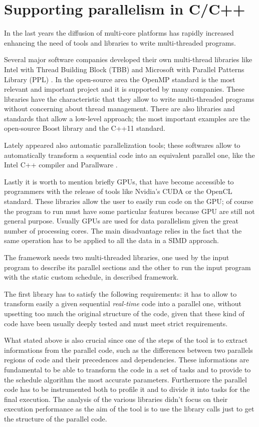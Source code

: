 \documentclass[a4paper,12pt,oneside]{book}
\begin{document}
\section{Supporting parallelism in C/C++}

In the last years the diffusion of multi-core platforms has rapidly increased enhancing the need of tools and libraries to write multi-threaded programs. 

Several major software companies developed their own multi-thread libraries like Intel with Thread Building Block (TBB) \cite{tbb} and Microsoft with Parallel Patterns Library (PPL) \cite{ppl}. In the open-source area the OpenMP standard \cite{openmp} is the  most relevant and important project and it is supported by many companies. These libraries have the characteristic that they allow to write multi-threaded programs without concerning about thread management. There are also libraries and standards that allow a low-level approach; the most important examples are the open-source Boost library \cite{boost} and the C++11 standard.

Lately appeared also automatic parallelization tools; these softwares allow to automatically transform a sequential code into an equivalent parallel one, like the Intel C++ compiler \cite{icc} and Parallware \cite{parallware}.  

Lastly it is worth to mention briefly GPUs, that have become accessible to programmers with the release of tools like Nvidia's CUDA or the OpenCL standard. These libraries allow the user to easily run code on the GPU; of course the program to run must have some particular features because GPU are still not general purpose. Usually GPUs are used for data parallelism given the great number of processing cores. The main disadvantage relies in the fact that the same operation has to be applied to all the data in a SIMD approach. 

The framework needs two multi-threaded libraries, one used by the input program to describe its parallel sections and the other to run the input program with the static custom schedule, in described framework.

The first library has to satisfy the following requirements: it has to allow to transform easily a given sequential \emph{real-time} code into a parallel one, without upsetting too much the original structure of the code, given that these kind of code have been usually deeply tested and must meet strict requirements.

What stated above is also crucial since one of the steps of the tool is to extract informations from the parallel code, such as the differences between two parallels regions of code and their precedences and dependencies. These informations are fundamental to be able to transform the code in a set of tasks and to provide to the schedule algorithm the most accurate parameters. Furthermore the parallel code has to be instrumented both to profile it and to divide it into tasks for the final execution. The analysis of the various libraries didn’t focus on their execution performance as the aim of the tool is to use the library calls just to get the structure of the parallel code.
\end{document}

